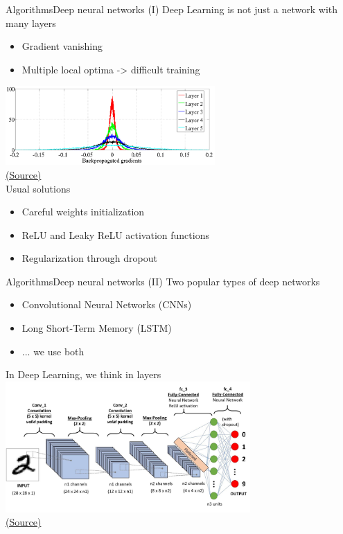 \documentclass[10pt,compress]{beamer} %
\begin{document}
\begin{frame}{Algorithms}{Deep neural networks (I)}
     Deep Learning is not just a network with many layers
	\begin{itemize}
		\item Gradient vanishing
		\item Multiple local optima -> difficult training
	\end{itemize}

	\centering
	\includegraphics[width=0.6\textwidth]{figs/gradients.png}\\
	\scriptsize\href{http://proceedings.mlr.press/v9/glorot10a/glorot10a.pdf?source=post\_page---------------------------}{(Source)}\\

	\normalsize
	\flushleft
	Usual solutions
	\begin{itemize}
		\item Careful weights initialization
		\item ReLU and Leaky ReLU activation functions
		\item Regularization through \alert{dropout}
	\end{itemize}
\end{frame}

\begin{frame}{Algorithms}{Deep neural networks (II)}
	Two popular types of deep networks
	\begin{itemize}
		\item Convolutional Neural Networks (CNNs)
		\item Long Short-Term Memory (LSTM) 
		\item ... we use both
	\end{itemize}

	In Deep Learning, we think in layers \\

	\centering
	\includegraphics[width=0.7\textwidth]{figs/layers.png}\\
	\scriptsize\href{https://towardsdatascience.com/a-comprehensive-guide-to-convolutional-neural-networks-the-eli5-way-3bd2b1164a53}{(Source)}\\

	\end{frame}
\end{document}
